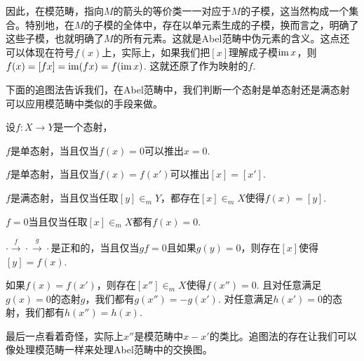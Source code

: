 因此，在模范畴，指向$M$的箭头的等价类一一对应于$M$的子模，这当然构成一个集合。特别地，在$M$的子模的全体中，存在以单元素生成的子模，换而言之，明确了这些子模，也就明确了$M$的所有元素。这就是Abel范畴中伪元素的含义。这点还可以体现在符号$f(x)$上，实际上，如果我们把$[x]$理解成子模$\operatorname{im} x$，则$f(x)=[fx]=\operatorname{im}(f x)=f(\operatorname{im} x)$. 这就还原了作为映射的$f$. 

下面的追图法告诉我们，在Abel范畴中，我们判断一个态射是单态射还是满态射可以应用模范畴中类似的手段来做。

\begin{pro}[追图法]
设$f:X\to Y$是一个态射，
\begin{compactenum}[~~~(1)]
\item $f$是单态射，当且仅当$f(x)=0$可以推出$x=0$.
\item $f$是单态射，当且仅当$f(x)=f(x')$可以推出$[x]=[x']$.
\item $f$是满态射，当且仅当任取$[y]\in_m Y$，都存在$[x]\in_m X$使得$f(x)=[y]$.
\item $f=0$当且仅当任取$[x]\in_m X$都有$f(x)=0$.
\item $\cdot \xrightarrow{f} \cdot \xrightarrow{g}\cdot$是正和的，当且仅当$gf=0$且如果$g(y)=0$，则存在$[x]$使得$[y]=f(x)$.
\item 如果$f(x)=f(x')$，则存在$[x'']\in_m X$使得$f(x'')=0$. 且对任意满足$g(x)=0$的态射$g$，我们都有$g(x'')=-g(x')$. 对任意满足$h(x')=0$的态射，我们都有$h(x'')=h(x)$.
\end{compactenum}
\end{pro}

最后一点看着奇怪，实际上$x''$是模范畴中$x-x'$的类比。追图法的存在让我们可以像处理模范畴一样来处理Abel范畴中的交换图。

